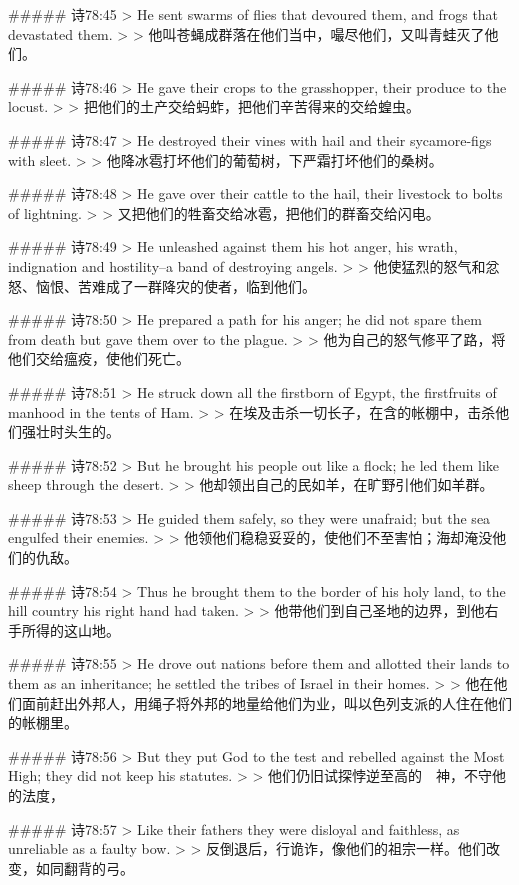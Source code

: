 ##### 诗78:45
> He sent swarms of flies that devoured them, and frogs that devastated them.
>
> 他叫苍蝇成群落在他们当中，嘬尽他们，又叫青蛙灭了他们。


##### 诗78:46
> He gave their crops to the grasshopper, their produce to the locust.
>
> 把他们的土产交给蚂蚱，把他们辛苦得来的交给蝗虫。


##### 诗78:47
> He destroyed their vines with hail and their sycamore-figs with sleet.
>
> 他降冰雹打坏他们的葡萄树，下严霜打坏他们的桑树。


##### 诗78:48
> He gave over their cattle to the hail, their livestock to bolts of lightning.
>
> 又把他们的牲畜交给冰雹，把他们的群畜交给闪电。


##### 诗78:49
> He unleashed against them his hot anger, his wrath, indignation and hostility--a band of destroying angels.
>
> 他使猛烈的怒气和忿怒、恼恨、苦难成了一群降灾的使者，临到他们。


##### 诗78:50
> He prepared a path for his anger; he did not spare them from death but gave them over to the plague.
>
> 他为自己的怒气修平了路，将他们交给瘟疫，使他们死亡。


##### 诗78:51
> He struck down all the firstborn of Egypt, the firstfruits of manhood in the tents of Ham.
>
> 在埃及击杀一切长子，在含的帐棚中，击杀他们强壮时头生的。


##### 诗78:52
> But he brought his people out like a flock; he led them like sheep through the desert.
>
> 他却领出自己的民如羊，在旷野引他们如羊群。


##### 诗78:53
> He guided them safely, so they were unafraid; but the sea engulfed their enemies.
>
> 他领他们稳稳妥妥的，使他们不至害怕；海却淹没他们的仇敌。


##### 诗78:54
> Thus he brought them to the border of his holy land, to the hill country his right hand had taken.
>
> 他带他们到自己圣地的边界，到他右手所得的这山地。


##### 诗78:55
> He drove out nations before them and allotted their lands to them as an inheritance; he settled the tribes of Israel in their homes.
>
> 他在他们面前赶出外邦人，用绳子将外邦的地量给他们为业，叫以色列支派的人住在他们的帐棚里。


##### 诗78:56
> But they put God to the test and rebelled against the Most High; they did not keep his statutes.
>
> 他们仍旧试探悖逆至高的　神，不守他的法度，


##### 诗78:57
> Like their fathers they were disloyal and faithless, as unreliable as a faulty bow.
>
> 反倒退后，行诡诈，像他们的祖宗一样。他们改变，如同翻背的弓。


